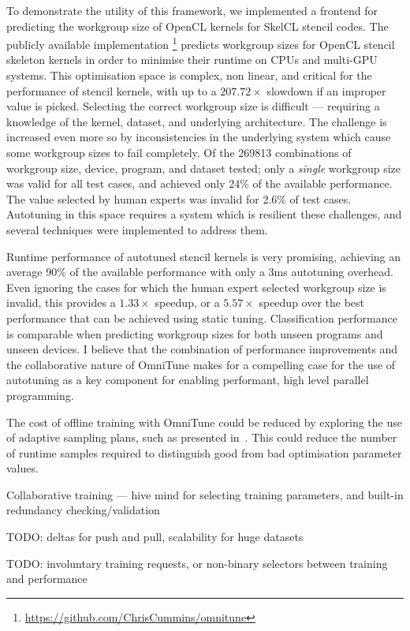 \documentclass[nonatbib,preprint,9pt]{sigplanconf}
\begin{document}
To demonstrate the utility of this framework, we implemented a
frontend for predicting the workgroup size of OpenCL kernels for
SkelCL stencil codes. The publicly available implementation
\footnote{\url{https://github.com/ChrisCummins/omnitune}} predicts
workgroup sizes for OpenCL stencil skeleton kernels in order to
minimise their runtime on CPUs and multi-GPU systems. This
optimisation space is complex, non linear, and critical for the
performance of stencil kernels, with up to a $207.72\times$ slowdown
if an improper value is picked. Selecting the correct workgroup size
is difficult --- requiring a knowledge of the kernel, dataset, and
underlying architecture. The challenge is increased even more so by
inconsistencies in the underlying system which cause some workgroup
sizes to fail completely. Of the 269813 combinations of workgroup
size, device, program, and dataset tested; only a \emph{single}
workgroup size was valid for all test cases, and achieved only 24\% of
the available performance. The value selected by human experts was
invalid for 2.6\% of test cases. Autotuning in this space requires a
system which is resilient these challenges, and several techniques
were implemented to address them.

Runtime performance of autotuned stencil kernels is very promising,
achieving an average 90\% of the available performance with only a 3ms
autotuning overhead. Even ignoring the cases for which the human
expert selected workgroup size is invalid, this provides a
$1.33\times$ speedup, or a $5.57\times$ speedup over the best
performance that can be achieved using static tuning. Classification
performance is comparable when predicting workgroup sizes for both
unseen programs and unseen devices. I believe that the combination of
performance improvements and the collaborative nature of OmniTune
makes for a compelling case for the use of autotuning as a key
component for enabling performant, high level parallel programming.

The cost of offline training with OmniTune could be reduced by
exploring the use of adaptive sampling plans, such as presented
in~\cite{Leather2009}. This could reduce the number of runtime samples
required to distinguish good from bad optimisation parameter values.

Collaborative training --- hive mind for selecting training
parameters, and built-in redundancy checking/validation

TODO: deltas for push and pull, scalability for huge datasets

TODO: involuntary training requests, or non-binary selectors between
training and performance
\end{document}
